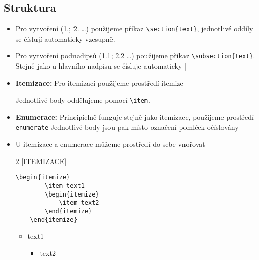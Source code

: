 \subsection{Struktura}
\begin{itemize}
    \item Pro vytvoření (1.; 2. \dots) použijeme příkaz \verb|\section{text}|, jednotlivé oddíly se číslují automaticky vzesupně. 
    \item Pro vytvoření podnadipsů (1.1; 2.2 \dots) použijeme příkaz  \verb|\subsection{text}|. Stejně jako u hlavního nadpisu se čísluje automaticky
   |
    \item \textbf{Itemizace:} Pro itemizaci použijeme prostředí itemize
    
    Jednotlivé body oddělujeme pomocí \verb|\item|.
    \item \textbf{Enumerace:} Principielně funguje stejně jako itemizace, použijeme prostředí \texttt{enumerate}  Jednotlivé body jsou pak místo označení pomlček  očíslovány
    \item U itemizace a enumerace můžeme prostředí do sebe vnořovat

  
    \begin{multicols}{2}
    [ITEMIZACE]
    \setlength{\columnsep}{10cm}
     \begin{lstlisting}[frame = single]
    \begin{itemize}
        \item text1
        \begin{itemize}
            \item text2
        \end{itemize}
    \end{itemize}
    \end{lstlisting}
    \columnbreak
   \begin{centering}
     
   \end{centering}
     \begin{itemize}
        \item text1
        \begin{itemize}
            \item text2
        \end{itemize}
    \end{itemize}
    

\end{multicols}
\end{itemize}
